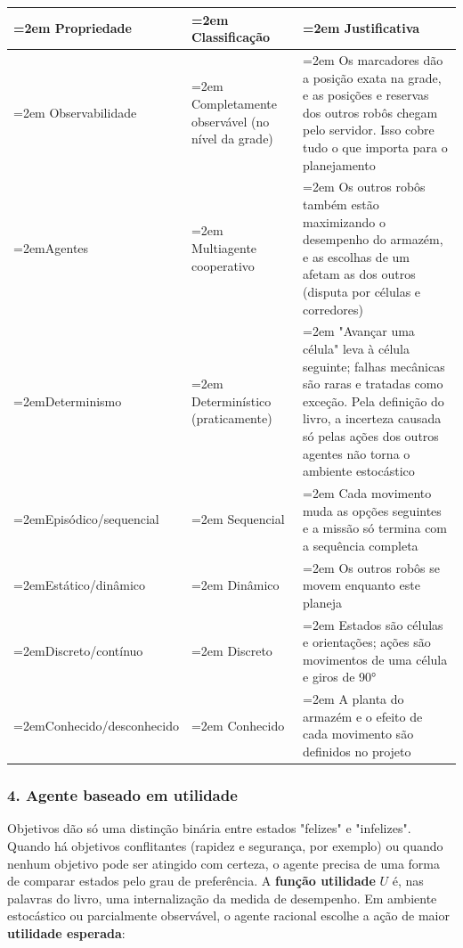 \documentclass[12pt, a4paper]{article}
\begin{document}
\begingroup
\setlength{\tabcolsep}{4.0pt}
\begin{longtable}{@{}>{\raggedright\hyphenpenalty=30\tolerance=999\emergencystretch=2em\arraybackslash}p{4.49cm}>{\raggedright\hyphenpenalty=30\tolerance=999\emergencystretch=2em\arraybackslash}p{3.48cm}>{\raggedright\hyphenpenalty=30\tolerance=999\emergencystretch=2em\arraybackslash}p{6.75cm}@{}}
\toprule\noalign{}
Propriedade & Clas\-si\-fi\-ca\-ção & Justificativa \\
\midrule\noalign{}
\endhead
\bottomrule\noalign{}
\endlastfoot
Observabilidade & Completamente ob\-ser\-vá\-vel (no nível da grade\allowbreak ) & Os marcadores dão a posição exata na grade, e as posições e reservas dos outros robôs chegam pelo servidor. Isso cobre tudo o que importa para o planejamento \\
Agentes & Multiagente cooperativo & Os outros robôs também estão maximizando o desempenho do armazém, e as escolhas de um afetam as dos outros (disputa por células e corredores\allowbreak ) \\
Determinismo & De\-ter\-mi\-nís\-tico (praticamente\allowbreak ) & "Avançar uma célula" leva à célula seguinte; falhas mecânicas são raras e tratadas como exceção. Pela definição do livro, a incerteza causada só pelas ações dos outros agentes não torna o ambiente es\-to\-cás\-tico \\
Episódico\slash sequencial & Sequencial & Cada movimento muda as opções seguintes e a missão só termina com a sequência completa \\
Estático\slash dinâmico & Dinâmico & Os outros robôs se movem enquanto este planeja \\
Discreto\slash contínuo & Discreto & Estados são células e ori\-en\-ta\-ções; ações são movimentos de uma célula e giros de 90° \\
Conhecido\slash desconhecido & Conhecido & A planta do armazém e o efeito de cada movimento são definidos no projeto \\
\end{longtable}
\endgroup

\subsubsection{4. Agente baseado em utilidade}\label{4-agente-baseado-em-utilidade}

Objetivos dão só uma distinção binária entre estados "felizes" e "infelizes". Quando há objetivos conflitantes (rapidez e segurança, por exemplo) ou quando nenhum objetivo pode ser atingido com certeza, o agente precisa de uma forma de comparar estados pelo grau de preferência. A \textbf{função utilidade} \(U\) é, nas palavras do livro, uma internalização da medida de desempenho. Em ambiente estocástico ou parcialmente observável, o agente racional escolhe a ação de maior \textbf{utilidade esperada}:
\end{document}
